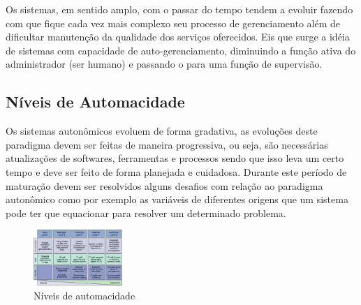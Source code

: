 \documentclass[11pt,twoside]{article}
\begin{document}
Os sistemas, em sentido amplo, com o passar do tempo tendem a evoluir fazendo com que fique cada vez mais complexo seu processo de gerenciamento além de dificultar manutenção da qualidade dos serviços oferecidos. Eis que surge a idéia de sistemas com capacidade de auto-gerenciamento, diminuindo a função ativa do administrador (ser humano) e passando o para uma função de supervisão.

\subsection{Níveis de Automacidade}
Os sistemas autonômicos evoluem de forma gradativa, as evoluções deste paradigma devem ser feitas de maneira progressiva, ou seja, são necessárias atualizações de softwares, ferramentas e processos sendo que isso leva um certo tempo e deve ser feito de forma planejada e cuidadosa. Durante este período de maturação devem ser resolvidos alguns desafios com relação ao paradigma autonômico como por exemplo as variáveis de diferentes origens que um sistema pode ter que equacionar para resolver um determinado problema. 

\begin{figure}
    \centering
    \includegraphics[width=0.3\textwidth]{Picture2.png}
\caption{Níveis de automacidade}
    \label{Sec:Intro:Fig1}
\end{figure}
\end{document}
